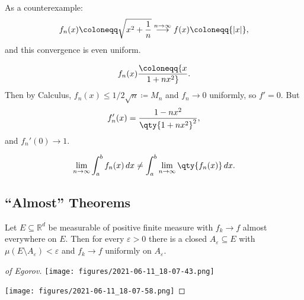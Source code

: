 \begin{example}[?]

As a counterexample:
\begin{align*}
f_n(x) \coloneqq\sqrt{x^2 + {1\over n}} \overset{n\to\infty}\longrightarrow f(x) \coloneqq{\left\lvert {x} \right\rvert}
,\end{align*}
and this convergence is even uniform.

\end{example}

\begin{example}[?]

\begin{align*}
f_n(x) \coloneqq{x\over 1 + nx^2}
.\end{align*}
Then by Calculus, \(f_n(x) \leq 1/2\sqrt{n} \coloneqq M_n\) and
\(f_n\to 0\) uniformly, so \(f' = 0\). But
\begin{align*}
f_n'(x) = {1-nx^2 \over\qty{1 + nx^2}^2}
,\end{align*}
and \(f_n'(0) \to 1\).

\end{example}

\begin{proposition}[?]

\begin{align*}  
\lim_{n\to \infty} \int_a^b f_n(x) \,dx \neq \int_a^b \lim_{n\to \infty} \qty{ f_n(x) } \,dx
.\end{align*}

\end{proposition}

\hypertarget{almost-theorems}{%
\subsection{``Almost'' Theorems}\label{almost-theorems}}

\begin{theorem}

Let \(E \subseteq {\mathbb{R}}^d\) be measurable of positive finite
measure with \(f_k\to f\) almost everywhere on \(E\). Then for every
\({\varepsilon}> 0\) there is a closed \(A_{\varepsilon}\subseteq E\)
with \(\mu(E\setminus A_{\varepsilon}) < {\varepsilon}\) and
\(f_k\to f\) uniformly on \(A_{\varepsilon}\).

\end{theorem}

\begin{proof}[of Egorov]

\texttt{[image: figures/2021-06-11\_18-07-43.png]}

\texttt{[image: figures/2021-06-11\_18-07-58.png]}

\end{proof}

